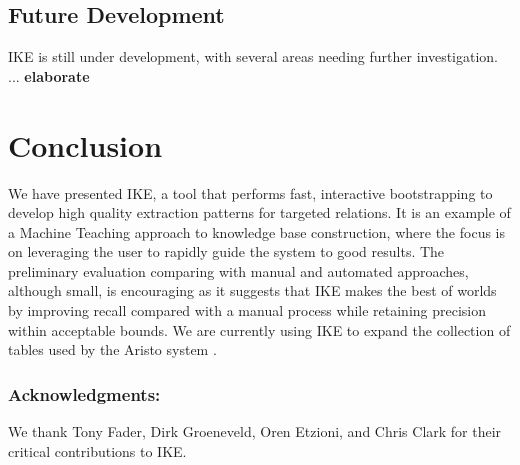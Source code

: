 \documentclass[11pt,letterpaper]{article}
\begin{document}


\subsection{Future Development}

IKE is still under development, with several areas needing further investigation. ...  {\bf elaborate}



\section{Conclusion}

We have presented IKE, a tool that performs fast, interactive bootstrapping to develop high quality extraction patterns for targeted relations. It is an example of a Machine Teaching approach to knowledge base construction, where the focus is on leveraging the user to rapidly guide the system to good results. The preliminary evaluation comparing with manual and automated approaches, although small, is encouraging as it suggests that IKE makes the best of worlds by improving recall compared with a manual process while retaining precision within acceptable bounds. We are currently using IKE to expand the collection of tables used by the Aristo system \cite{clark:2016}.


\subsubsection*{Acknowledgments:} 
We thank Tony Fader, Dirk Groeneveld, Oren Etzioni, and Chris Clark for their critical contributions to IKE.



\end{document}
